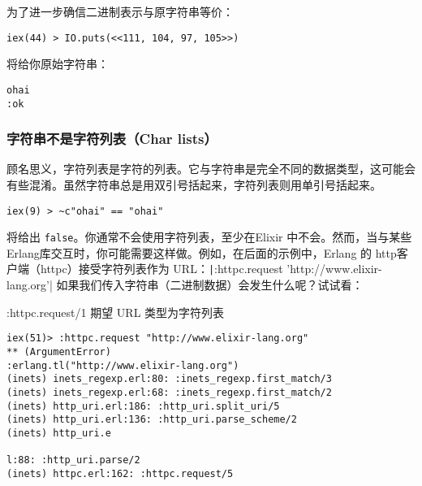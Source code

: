 为了进一步确信二进制表示与原字符串等价：

\begin{code}{}\begin{verbatim}
iex(44) > IO.puts(<<111, 104, 97, 105>>)
\end{verbatim}
\end{code}

将给你原始字符串：

\begin{code}{}\begin{verbatim}
ohai
:ok
\end{verbatim}
\end{code}


\subsubsection{字符串不是字符列表（Char lists）}

顾名思义，字符列表是字符的列表。它与字符串是完全不同的数据类型，这可能会有些混淆。虽然字符串总是用双引号括起来，字符列表则用单引号括起来。

\begin{code}{}\begin{verbatim}
iex(9) > ~c"ohai" == "ohai"
\end{verbatim}
\end{code}

将给出 \texttt{false}。你通常不会使用字符列表，至少在Elixir 中不会。然而，当与某些 Erlang库交互时，你可能需要这样做。例如，在后面的示例中，Erlang 的 http客户端（httpc）接受字符列表作为 URL：\texttt|:httpc.request 'http://www.elixir-lang.org'|
如果我们传入字符串（二进制数据）会发生什么呢？试试看：

\begin{code}{:httpc.request/1 期望 URL 类型为字符列表}
\begin{verbatim}
iex(51)> :httpc.request "http://www.elixir-lang.org"
** (ArgumentError) 
:erlang.tl("http://www.elixir-lang.org")
(inets) inets_regexp.erl:80: :inets_regexp.first_match/3
(inets) inets_regexp.erl:68: :inets_regexp.first_match/2
(inets) http_uri.erl:186: :http_uri.split_uri/5
(inets) http_uri.erl:136: :http_uri.parse_scheme/2
(inets) http_uri.e

l:88: :http_uri.parse/2
(inets) httpc.erl:162: :httpc.request/5
\end{verbatim}
\label{lst:httpc_request_1_expects_the_url_to_be_a_char_list}
\end{code}


